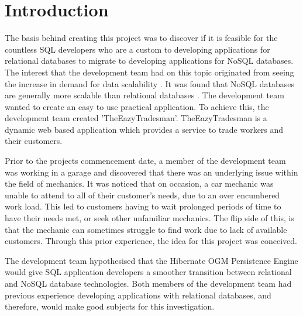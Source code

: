 %


\chapter{Introduction}
\label{sec:Introduction}

The basis behind creating this project was to discover if it is feasible for the countless SQL developers who are a custom to developing applications for relational databases to migrate to developing applications for NoSQL databases. The interest that the development team had on this topic originated from seeing the increase in demand for data scalability \cite{agrawal2011database}. It was found that NoSQL databases are generally more scalable than relational databases \cite{han2011survey}. The development team wanted to create an easy to use practical application. To achieve this, the development team created 'TheEazyTradesman'. TheEazyTradesman is a dynamic web based application which provides a service to trade workers and their customers.

\bigskip

Prior to the projects commencement date, a member of the development team was working in a garage and discovered that there was an underlying issue within the field of mechanics. It was noticed that on occasion, a car mechanic was unable to attend to all of their customer's needs, due to an over encumbered work load. This led to customers having to wait prolonged periods of time to have their needs met, or seek other unfamiliar mechanics. The flip side of this, is that the mechanic can sometimes struggle to find work due to lack of available customers. Through this prior experience, the idea for this project was conceived.

\bigskip

The development team hypothesised that the Hibernate OGM Persistence Engine would give SQL application developers a smoother transition between relational and NoSQL database technologies. Both members of the development team had previous experience developing applications with relational databases, and therefore, would make good subjects for this investigation.

